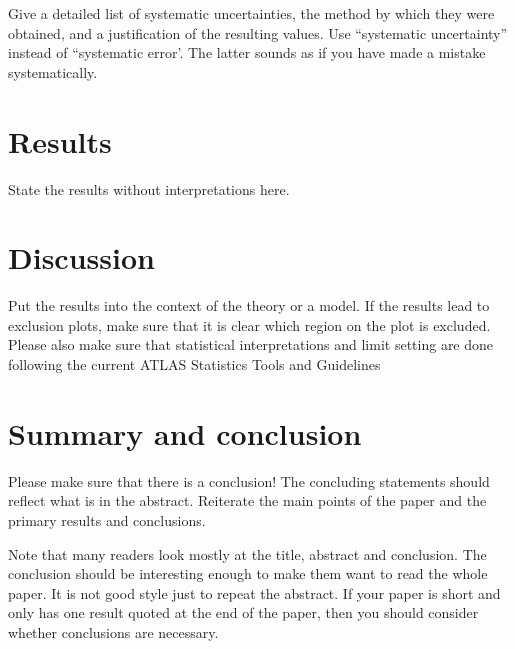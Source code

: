 \documentclass[UKenglish]{latex/atlasdoc}
\begin{document}
Give a detailed list of systematic uncertainties, the method by which they were obtained,
and a justification of the resulting values.
Use ``systematic uncertainty'' instead of ``systematic error'.
The latter sounds as if you have made a mistake systematically.


\section{Results}
\label{sec:result}

State the results without interpretations here.


\section{Discussion}
\label{sec:discussion}

Put the results into the context of the theory or a model.
If the results lead to exclusion plots, make sure that it is clear which region on the plot is excluded.
Please also make sure that statistical interpretations and limit setting are done 
following the current ATLAS Statistics Tools and Guidelines


\section{Summary and conclusion}
\label{sec:summary}


Please make sure that there is a conclusion!
The concluding statements should reflect what is in the abstract.
Reiterate the main points of the paper and the primary results and conclusions.

Note that many readers look mostly at the title, abstract and conclusion.
The conclusion should be interesting enough to make them want to read the whole paper.
It is not good style just to repeat the abstract.
If your paper is short and only has one result quoted at the end of the paper,
then you should consider whether conclusions are necessary.
\end{document}
